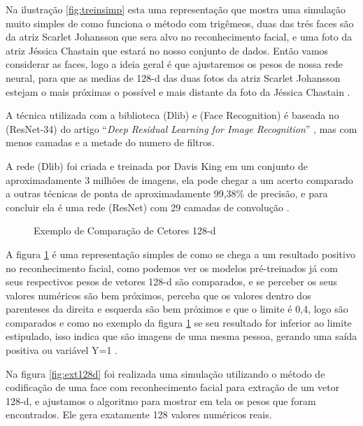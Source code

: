 Na ilustração \ref{fig:treinsimp} esta uma representação que mostra uma simulação muito simples de como funciona o método com trigêmeos, duas das trés faces são da atriz Scarlet Johansson que sera alvo no reconhecimento facial, e uma foto da atriz Jéssica Chastain que estará no nosso conjunto de dados. Então vamos considerar as faces, logo a ideia geral é que ajustaremos os pesos de nossa rede neural, para que as medias de 128-d das duas fotos da atriz Scarlet Johansson estejam o mais próximas o possível e mais distante da foto da Jéssica Chastain \cite{adamgeitgey}.

A técnica utilizada com a biblioteca (Dlib) e (Face Recognition) é baseada no (ResNet-34) do artigo “\textit{Deep Residual Learning for Image Recognition}” \cite{DBLP:journals/corr/HeZRS15}, mas com menos camadas e a metade do numero de filtros. 

A rede (Dlib) foi criada e treinada por Davis King em um conjunto de aproximadamente 3 milhões de imagens, ela pode chegar a um acerto comparado a outras técnicas de ponta de aproximadamente 99,38\% de precisão, e para concluir ela é uma rede (ResNet) com 29 camadas de convolução \cite{dlib1}.
\begin{figure}[H]
	\centering
	\caption{Exemplo de Comparação de Cetores 128-d}
	\fontsize{9pt}{12pt}\selectfont
	\def\svgwidth{13cm}
	
	\label{fig:exetrein}
\end{figure}

A figura \ref{fig:exetrein} é uma representação simples de como se chega a um resultado positivo no reconhecimento facial, como podemos ver os modelos pré-treinados já com seus respectivos pesos de vetores 128-d são comparados, e se perceber os seus valores numéricos são bem próximos, perceba que os valores dentro dos parenteses da direita e esquerda são bem próximos e que o limite é 0,4, logo são comparados e como no exemplo da figura \ref{fig:exetrein} se seu resultado for inferior ao limite estipulado, isso indica que são imagens de uma mesma pessoa, gerando uma saída positiva ou variável Y=1 \cite{adamgeitgey}.

Na figura \ref{fig:ext128d} foi realizada uma simulação utilizando o método de codificação de uma face com reconhecimento facial para extração de um vetor 128-d, e ajustamos o algoritmo para mostrar em tela os pesos que foram encontrados. Ele gera exatamente 128 valores numéricos reais. 

